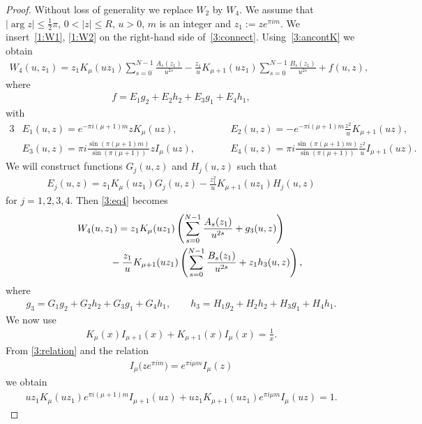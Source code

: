 \begin{proof}
Without loss of generality we replace $W_2$ by $W_4$. We assume that $|\arg z|\le \frac12\pi$, $0<|z|\le R$, $u>0$, $m$ is an integer and $z_1:=ze^{\pi im}$.
We insert~\eqref{1:W1}, \eqref{1:W2} on the right-hand side of~\eqref{3:connect}.
Using~\eqref{3:ancontK} we obtain
\begin{gather}\label{3:eq4}
W_4(u,z_1)=z_1K_\mu(uz_1)\sum_{s=0}^{N-1} \frac{A_s(z_1)}{u^{2s}}
-\frac{z_1}{u}K_{\mu+1}(uz_1)\sum_{s=0}^{N-1} \frac{B_s(z_1)}{u^{2s}}+f(u,z),
\end{gather}
where
\begin{gather*}%
 f=E_1g_2+E_2h_2+E_3g_1+E_4h_1,
\end{gather*}
with
\begin{alignat*}{3}
& E_1(u,z) = e^{-\pi i(\mu+1)m} zK_\mu(uz),\qquad &&
 E_2(u,z) = -e^{-\pi i (\mu+1)m}\frac{z^2}{u} K_{\mu+1}(uz),&\\
& E_3(u,z) = \pi i\frac{\sin(\pi(\mu+1)m)}{\sin(\pi(\mu+1))}z I_\mu(uz),\qquad&&
 E_4(u,z) = \pi i \frac{\sin(\pi (\mu+1)m)}{\sin(\pi (\mu+1))}\frac{z^2}{u}I_{\mu+1}(uz) .&
\end{alignat*}
We will construct functions $G_j(u,z)$ and $H_j(u,z)$ such that
\begin{gather*} E_j(u,z)=z_1 K_\mu(uz_1) G_j(u,z)-\frac{z_1^2}{u} K_{\mu+1}(uz_1) H_j(u,z)
\end{gather*}
for $j=1,2,3,4$.
Then \eqref{3:eq4} becomes
\begin{gather}
W_4(u,z_1)=z_1K_\mu(uz_1)\left(\sum_{s=0}^{N-1} \frac{A_s(z_1)}{u^{2s}}+g_3(u,z)\right)\nonumber\\
\hphantom{W_4(u,z_1)=}{}
-\frac{z_1}{u}K_{\mu+1}(uz_1)\left(\sum_{s=0}^{N-1} \frac{B_s(z_1)}{u^{2s}}+z_1h_3(u,z)\right),\label{4:eq5}
\end{gather}
where
\begin{gather*}
g_3 = G_1 g_2+G_2h_2+G_3 g_1+G_4 h_1,\qquad
h_3 = H_1 g_2+H_2h_2+H_3 g_1+H_4 h_1.
\end{gather*}
We now use \cite[(10.28.2)]{NIST}
\begin{gather}\label{3:relation}
 K_\mu(x)I_{\mu+1}(x)+K_{\mu+1}(x)I_\mu(x)=\frac1x .
\end{gather}
From \eqref{3:relation} and the relation
\begin{gather}\label{3:ancontI}
 I_\mu\big(ze^{\pi im}\big)=e^{\pi i\mu m}I_\mu(z)
\end{gather}
we obtain
\begin{gather*} u z_1K_\mu(uz_1) e^{\pi i (\mu+1)m} I_{\mu+1}(uz)+uz_1K_{\mu+1}(uz_1) e^{\pi i \mu m} I_\mu(uz)=1 .\end{gather*}

\end{proof}
